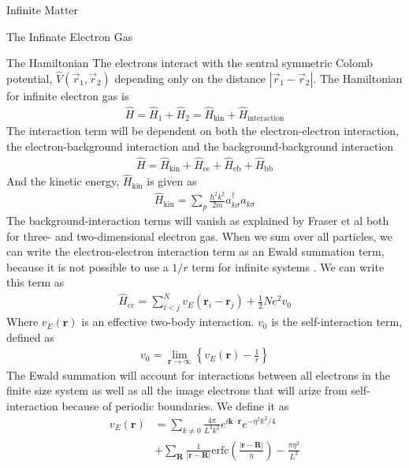 \documentclass[twoside,english]{uiofysmaster}
\begin{document}
\begin{chapter}{Infinite Matter}
\begin{section}{The Infinate Electron Gas}
		\begin{subsection}{The Hamiltonian}
			The electrons interact with the sentral symmetric Colomb potential, $\hat V(\vec r_1, \vec r_2)$ depending only on the distance $\left| \vec r_1 - \vec r_2 \right|$. The Hamiltonian for infinite electron gas is \cite{Baardsen}
			\begin{align}
				\hat H = \hat H_1 + \hat H_2 = \hat H_{\text{kin}} + \hat H_{\text{interaction}}
			\end{align}
			The interaction term will be dependent on both the electron-electron interaction, the electron-background interaction and the background-background interaction
			\begin{align}
				\hat H = \hat H_{\text{kin}} + \hat H_{\text{ee}} + \hat H_{\text{eb}} + \hat H_{\text{bb}}
			\end{align}
			And the kinetic energy, $\hat H_{\text{kin}}$ is given as
			\begin{align}
				\hat H_{\text{kin}} = \sum_p \frac{\hbar ^2 k^2}{2m} a_{k \sigma}^{\dagger} a_{k \sigma}
			\end{align}
			The background-interaction terms will vanish as explained by Fraser et al \cite{Fraser et al} both for three- and two-dimensional electron gas. When we sum over all particles, we can write the electron-electron interaction term as an Ewald summation term, because it is not possible to use a $1/r$ term for infinite systems \cite{Drummond2008} \cite{MHJonline}. We can write this term as
			\begin{align}
				\hat H_{ee} = \sum_{i<j}^N v_E(\mathbf{r}_i - \mathbf{r}_j) + \frac{1}{2}Ne^2v_0
			\end{align}
			Where $v_E(\mathbf{r})$ is an effective two-body interaction. $v_0$ is the self-interaction term, defined as 
			\begin{align}
				v_0 = \lim_{\mathbf{r}\rightarrow \infty} \left\{ v_E(\mathbf{r}) - \frac{1}{r} \right\}
			\end{align}
			The Ewald summation will account for interactions between all electrons in the finite size system as well as all the image electrons that will arize from self-interaction because of periodic boundaries. We define it as 
			\begin{align}
				v_E(\mathbf{r}) &= \sum_{k \neq 0} \frac{4\pi}{L^3k^2} e^{i \mathbf{k}\cdot \mathbf{r} } e^{-\eta^2 k^2 / 4} \\
								&+ \sum_{\mathbf{R}} \frac{1}{|	\mathbf{r} - \mathbf{R}|} \text{erfc} \left( \frac{| \mathbf{r} - \mathbf{R}|}{\eta} \right) - \frac{\pi \eta^2}{L^3}

\end{align}
\end{subsection}
\end{section}
\end{chapter}
\end{document}
